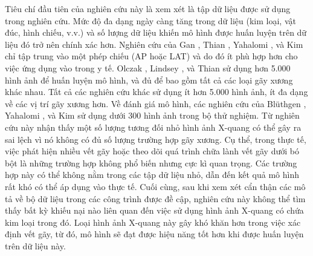 \documentclass[../the.tex]{subfiles}
\begin{document}
{\fontsize{13}{12} \selectfont
Tiêu chí đầu tiên của nghiên cứu này là xem xét là tập dữ liệu được sử dụng trong nghiên cứu. Mức độ đa dạng ngày càng tăng trong dữ liệu (kim loại, vật đúc, hình chiếu, v.v.) và số lượng dữ liệu khiến mô hình được huấn luyện trên dữ liệu đó trở nên chính xác hơn. Nghiên cứu của Gan \etal \cite{Gan2019}, Thian \etal \cite{Thian2019}, Yahalomi \etal \cite{Yahalomi2019DetectionOD}, và Kim \etal \cite{Kim2018} chỉ tập trung vào một phép chiếu (AP hoặc LAT) và do đó ít phù hợp hơn cho việc ứng dụng vào trong y tế. Olczak \etal \cite{Olczak2017}, Lindsey \etal \cite{Lindsey1806905115}, và Thian \etal \cite{Thian2019} sử dụng hơn 5.000 hình ảnh để huấn luyện mô hình, và đủ để bao gồm tất cả các loại gãy xương khác nhau. Tất cả các nghiên cứu khác sử dụng ít hơn 5.000 hình ảnh, ít đa dạng về các vị trí gãy xương hơn. Về đánh giá mô hình, các nghiên cứu của Bl\"{u}thgen \etal \cite{Blthgen2020}, Yahalomi \etal \cite{Yahalomi2019DetectionOD}, và Kim \etal \cite{Kim2018} sử dụng dưới 300 hình ảnh trong bộ thử nghiệm. Từ nghiên cứu này nhận thấy một số lượng tương đối nhỏ hình ảnh X-quang có thể gây ra sai lệch vì nó không có đủ số lượng trường hợp gãy xương. Cụ thể, trong thực tế, việc phát hiện nhiều vết gãy hoặc theo dõi quá trình chữa lành vết gãy dưới bó bột là những trường hợp không phổ biến nhưng cực kì quan trọng. Các trường hợp này có thể không nằm trong các tập dữ liệu nhỏ, dẫn đến kết quả mô hình rất khó có thể áp dụng vào thực tế. Cuối cùng, sau khi xem xét cẩn thận các mô tả về bộ dữ liệu trong các công trình được đề cập, nghiên cứu này không thể tìm thấy bất kỳ khiếu nại nào liên quan đến việc sử dụng hình ảnh X-quang có chứa kim loại trong đó. Loại hình ảnh X-quang này gây khó khăn hơn trong việc xác định vết gãy, từ đó, mô hình sẽ đạt được hiệu năng tốt hơn khi được huấn luyện trên dữ liệu này.
}
\end{document}
